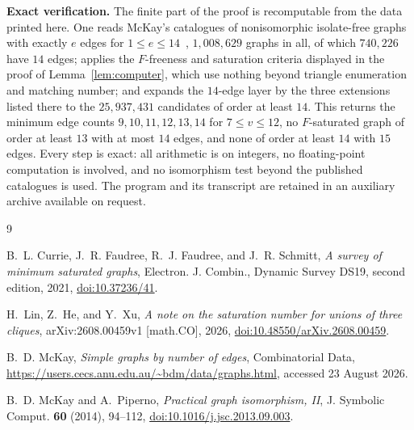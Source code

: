 \documentclass[11pt]{amsart}
\begin{document}
\medskip
\noindent\textbf{Exact verification.}
The finite part of the proof is recomputable from the data printed here. One
reads McKay's catalogues of nonisomorphic isolate-free graphs with exactly $e$
edges for $1\le e\le14$~\cite{McKayData}, $1{,}008{,}629$ graphs in all, of
which $740{,}226$ have $14$ edges; applies the $F$-freeness and saturation
criteria displayed in the proof of Lemma~\ref{lem:computer}, which use nothing
beyond triangle enumeration and matching number; and expands the $14$-edge
layer by the three extensions listed there to the $25{,}937{,}431$ candidates
of order at least $14$. This returns the minimum edge counts
$9,10,11,12,13,14$ for $7\le v\le12$, no $F$-saturated graph of order at least
$13$ with at most $14$ edges, and none of order at least $14$ with $15$ edges.
Every step is exact: all arithmetic is on integers, no floating-point
computation is involved, and no isomorphism test beyond the published
catalogues is used. The program and its transcript are retained in an
auxiliary archive available on request.

\begin{thebibliography}{9}

B.~L. Currie, J.~R. Faudree, R.~J. Faudree, and J.~R. Schmitt,
\emph{A survey of minimum saturated graphs},
Electron. J. Combin., Dynamic Survey DS19, second edition, 2021,
\href{https://doi.org/10.37236/41}{doi:10.37236/41}.

H.~Lin, Z.~He, and Y.~Xu,
\emph{A note on the saturation number for unions of three cliques},
arXiv:2608.00459v1 [math.CO], 2026,
\href{https://doi.org/10.48550/arXiv.2608.00459}
{doi:10.48550/arXiv.2608.00459}.

B.~D. McKay,
\emph{Simple graphs by number of edges}, Combinatorial Data,
\url{https://users.cecs.anu.edu.au/~bdm/data/graphs.html},
accessed 23 August 2026.

B.~D. McKay and A.~Piperno,
\emph{Practical graph isomorphism, II},
J. Symbolic Comput. \textbf{60} (2014), 94--112,
\href{https://doi.org/10.1016/j.jsc.2013.09.003}
{doi:10.1016/j.jsc.2013.09.003}.

\end{thebibliography}
\end{document}
